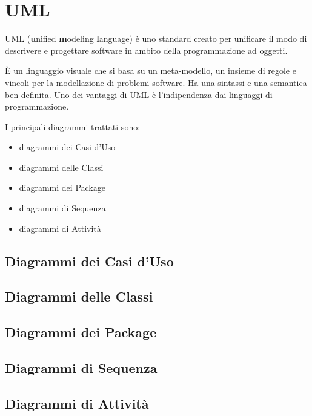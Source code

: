 \chapter{UML}
UML (\textbf{u}nified \textbf{m}odeling \textbf{l}anguage) è uno standard creato per unificare il modo di descrivere e progettare software in ambito della programmazione ad oggetti. 

\`E un linguaggio visuale che si basa su un meta-modello, un insieme di regole e vincoli per la modellazione di problemi software.
Ha una sintassi e una semantica ben definita. Uno dei vantaggi di UML è l'indipendenza dai linguaggi di programmazione.

I principali diagrammi trattati sono:
\begin{itemize}
\item diagrammi dei Casi d'Uso
\item diagrammi delle Classi
\item diagrammi dei Package
\item diagrammi di Sequenza
\item diagrammi di Attività
\end{itemize} 

\section{Diagrammi dei Casi d'Uso}







\section{Diagrammi delle Classi}
\section{Diagrammi dei Package}
\section{Diagrammi di Sequenza}
\section{Diagrammi di Attività}